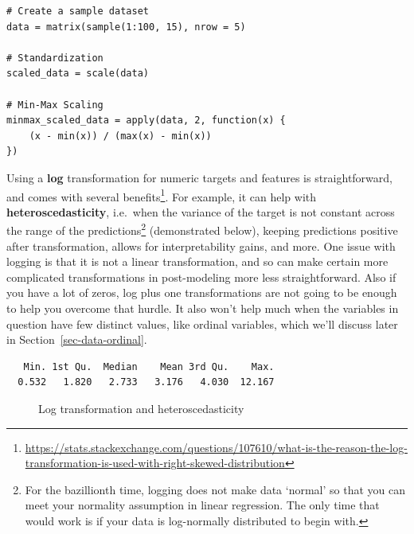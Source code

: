 \documentclass[
  letterpaper,
]{krantz}
\DeclareRobustCommand{\href}[2]{#2\footnote{\url{#1}}}
\begin{document}
\begin{verbatim}
# Create a sample dataset
data = matrix(sample(1:100, 15), nrow = 5)

# Standardization
scaled_data = scale(data)

# Min-Max Scaling
minmax_scaled_data = apply(data, 2, function(x) {
    (x - min(x)) / (max(x) - min(x))
})
\end{verbatim}

Using a \textbf{log} transformation for numeric targets and features is
straightforward, and
\href{https://stats.stackexchange.com/questions/107610/what-is-the-reason-the-log-transformation-is-used-with-right-skewed-distribution}{comes
with several benefits}. For example, it can help with
\textbf{heteroscedasticity}, i.e.~when the variance of the target is not
constant across the range of the predictions\footnote{For the
  bazillionth time, logging does not make data `normal' so that you can
  meet your normality assumption in linear regression. The only time
  that would work is if your data is log-normally distributed to begin
  with.} (demonstrated below), keeping predictions positive after
transformation, allows for interpretability gains, and more. One issue
with logging is that it is not a linear transformation, and so can make
certain more complicated transformations in post-modeling more less
straightforward. Also if you have a lot of zeros, log plus one
transformations are not going to be enough to help you overcome that
hurdle. It also won't help much when the variables in question have few
distinct values, like ordinal variables, which we'll discuss later in
Section~\ref{sec-data-ordinal}.

\begin{verbatim}
   Min. 1st Qu.  Median    Mean 3rd Qu.    Max. 
  0.532   1.820   2.733   3.176   4.030  12.167 
\end{verbatim}

\begin{figure}[H]


\caption{\label{fig-log-transformation-heteroscedasticity}Log
transformation and heteroscedasticity}

\end{figure}%
\end{document}
